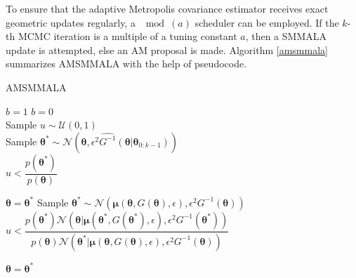 \documentclass[twoside,11pt]{article}
\begin{document}
To ensure that the adaptive Metropolis covariance estimator receives exact geometric updates regularly, a $\mod{(a)}$ 
scheduler can be employed. If the $k$-th MCMC iteration is a multiple of a tuning constant $a$, then a SMMALA update is 
attempted, else an AM proposal is made. Algorithm \ref{amsmmala} summarizes AMSMMALA with the help of pseudocode.

\begin{algorithm}[t]
	\caption{AMSMMALA}
	\label{amsmmala}
	\begin{algorithmic}
		  \State $b = 1$
		\Else
		  \State $b = 0$
		\EndIf\\
		
		\State Sample $u\sim\mathcal{U}(0, 1)$\\
		
		 
		\State Sample 
		$\boldsymbol{\theta^{*}}
		\sim\mathcal{N}(\boldsymbol{\theta},
		\epsilon^2 \widehat{G^{-1}}(\boldsymbol{\theta}|\boldsymbol{\theta}_{0:k-1}))
		$\\
		
		\If
		{
			$u<\dfrac{p(\boldsymbol{\theta}^{*})}{p(\boldsymbol{\theta})}$
		}
		
		\State $\boldsymbol{\theta}=\boldsymbol{\theta}^{*}$
		\EndIf
		 
		\State Sample 
		$\boldsymbol{\theta^{*}}
		\sim\mathcal{N}(\boldsymbol{\mu}(\boldsymbol{\theta}, G(\boldsymbol{\theta}), \epsilon),
		\epsilon^2 G^{-1}(\boldsymbol{\theta}))
		$\\
		
		\If
		{
			$u<\dfrac{
				p(\boldsymbol{\theta}^{*})
				\mathcal{N}(\boldsymbol{\theta}|
				\boldsymbol{\mu}(\boldsymbol{\theta}^{*},
				G(\boldsymbol{\theta}^{*}),
				\epsilon),
				\epsilon^2 G^{-1}(\boldsymbol{\theta}^{*}))
			}
			{
				p(\boldsymbol{\theta})
				\mathcal{N}(\boldsymbol{\theta}^{*}|
				\boldsymbol{\mu}(\boldsymbol{\theta},
				G(\boldsymbol{\theta}),
				\epsilon),
				\epsilon^2 G^{-1}(\boldsymbol{\theta}))
			}$
		}
		
		\State $\boldsymbol{\theta}=\boldsymbol{\theta}^{*}$
		\EndIf
		\EndIf
		
		\EndFor
	\end{algorithmic}
\end{algorithm}
\end{document}
